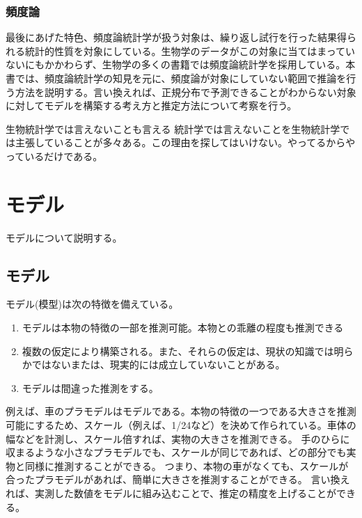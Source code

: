 \subsection{頻度論}
最後にあげた特色、頻度論統計学が扱う対象は、繰り返し試行を行った結果得られる統計的性質を対象にしている。生物学のデータがこの対象に当てはまっていないにもかかわらず、生物学の多くの書籍では頻度論統計学を採用している。本書では、頻度論統計学の知見を元に、頻度論が対象にしていない範囲で推論を行う方法を説明する。言い換えれば、正規分布で予測できることがわからない対象に対してモデルを構築する考え方と推定方法について考察を行う。

\begin{SMbox}{生物統計学では言えないことも言える}
 統計学では言えないことを生物統計学では主張していることが多々ある。この理由を探してはいけない。やってるからやっているだけである。
\end{SMbox}

\chapter{モデル}
モデルについて説明する。

\section{モデル}
モデル(模型)は次の特徴を備えている。
\begin{enumerate}
 \item モデルは本物の特徴の一部を推測可能。本物との乖離の程度も推測できる
 \item 複数の仮定により構築される。また、それらの仮定は、現状の知識では明らかではないまたは、現実的には成立していないことがある。
 \item モデルは間違った推測をする。
\end{enumerate}
  
例えば、車のプラモデルはモデルである。本物の特徴の一つである大きさを推測可能にするため、スケール（例えば、1/24など）を決めて作られている。車体の幅などを計測し、スケール倍すれば、実物の大きさを推測できる。
手のひらに収まるような小さなプラモデルでも、スケールが同じであれば、どの部分でも実物と同様に推測することができる。
つまり、本物の車がなくても、スケールが合ったプラモデルがあれば、簡単に大きさを推測することができる。
言い換えれば、実測した数値をモデルに組み込むことで、推定の精度を上げることができる。

